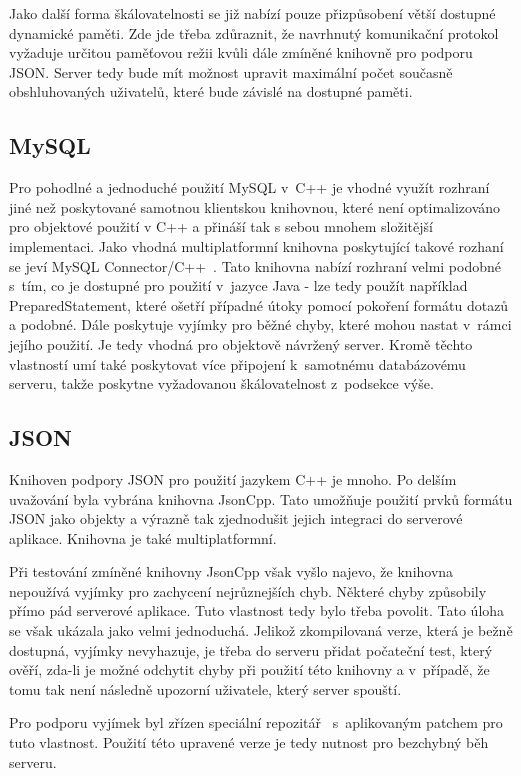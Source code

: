 \documentclass[thesis=B,czech]{FITthesis}[2013/10/20]
\begin{document}
Jako další forma škálovatelnosti se již nabízí pouze přizpůsobení větší dostupné dynamické paměti. Zde jde třeba zdůraznit, že navrhnutý komunikační protokol vyžaduje určitou paměťovou režii kvůli dále zmíněné knihovně pro podporu JSON. Server tedy bude mít možnost upravit maximální počet současně obshluhovaných uživatelů, které bude závislé na dostupné paměti.

\subsection{MySQL}

Pro pohodlné a jednoduché použití MySQL v~C++ je vhodné využít rozhraní jiné než poskytované samotnou klientskou knihovnou, které není optimalizováno pro objektové použití v C++ a přináší tak s sebou mnohem složitější implementaci. Jako vhodná multiplatformní knihovna poskytující takové rozhaní se jeví MySQL Connector/C++~\cite{mysqlconn}. Tato knihovna nabízí rozhraní velmi podobné s~tím, co je dostupné pro použití v~jazyce Java - lze tedy použít například PreparedStatement, které ošetří případné útoky pomocí pokoření formátu dotazů a podobné. Dále poskytuje vyjímky pro běžné chyby, které mohou nastat v~rámci jejího použití. Je tedy vhodná pro objektově návržený server. Kromě těchto vlastností umí také poskytovat více připojení k~samotnému databázovému serveru, takže poskytne vyžadovanou škálovatelnost z~podsekce výše.

\subsection{JSON}

Knihoven podpory JSON pro použití jazykem C++ je mnoho. Po delším uvažování byla vybrána knihovna JsonCpp. Tato umožňuje použití prvků formátu JSON jako objekty a výrazně tak zjednodušit jejich integraci do serverové aplikace. Knihovna je také multiplatformní.

Při testování zmíněné knihovny JsonCpp však vyšlo najevo, že knihovna nepoužívá vyjímky pro zachycení nejrůznejších chyb. Některé chyby způsobily přímo pád serverové aplikace. Tuto vlastnost tedy bylo třeba povolit. Tato úloha se však ukázala jako velmi jednoduchá. Jelikož zkompilovaná verze, která je bežně dostupná, vyjímky nevyhazuje, je třeba do serveru přidat počateční test, který ověří, zda-li je možné odchytit chyby při použití této knihovny a v~případě, že tomu tak není následně upozorní uživatele, který server spouští.

Pro podporu vyjímek byl zřízen speciální repozitář~\cite{json_ex_repo} s~aplikovaným patchem pro tuto vlastnost. Použití této upravené verze je tedy nutnost pro bezchybný běh serveru.
\end{document}
